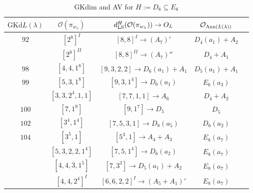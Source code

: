 \documentclass[reqno,12pt]{amsart}
\numberwithin{equation}{section}
\theoremstyle{plain}
\theoremstyle{definition}
\newcommand{\lam}{\lambda}
\renewcommand{\subset}{\subseteq}
\begin{document}
\begin{table}[htbp]\caption{ GKdim and AV for $H:=D_8\subset E_8$}
	\label{tabd8-1}
	\centering
	\renewcommand{\arraystretch}{1.5}
	\setlength\tabcolsep{5pt}
	
{	\begin{tabular}{|c|c|c|c|c|}
		\hline $\mathrm{GKd} L(\lambda)$ & $\mathcal{O}(\pi_{w_{\lam}})$& $d_{\rm LS}^{H}(\mathcal{O}(\pi_{w_\lambda}))\rightarrow    O_{L}$& $\mathcal{O}_{{\rm Ann}(L(\lambda))}$ \\ \hline
		 $ 92 $    &   $[2^8]^I$ & $[8,8]^I\rightarrow    (A_7)' $     &   $ D_4(a_1)+A_2$      \\ 
		   &   $[2^8]^{II}$ &    $[8,8]^{II}\rightarrow     (A_7)'' $   &   $D_4+A_1 $        \\ \hline
     $ 98 $    &  $ [4,4,1^8] $  & $[9,3,2,2]\rightarrow     D_6(a_1)+A_1 $     &   $ D_5(a_1)+A_1$      \\
     \hline
      $ 99 $    &  $ [5, 3, 1^8] $  & $[9,3,1^4]\rightarrow     D_6(a_1) $     &   $ E_6(a_3)$      \\ 
          &  $ [3, 3, 2^4, 1, 1] $  & $[7,7,1,1]\rightarrow     A_6$     &   $ D_4+A_2$      \\ \hline
       $ 100 $    &  $ [7,1^9] $  & $[9,1^7]\rightarrow     D_5 $     &   $ D_5$      \\ \hline
        $ 102 $    &  $ [3^4,1^4] $  & $[7,5,3,1]\rightarrow    D_8(a_5)$     &   $ D_6(a_2)$     
        \\\hline
         $ 104 $    &  $ [3^5,1] $  & $[5^3,1]\rightarrow     A_4+A_3$     &   $ E_8(a_7)$      \\ 
         &  $ [5,3,2,2,1^4] $  & $[7,5,1^4]\rightarrow    D_6(a_2)  $     &   $ E_8(a_7)$      \\
         &  $ [4,4,3,1^5] $  & $[7,3^3]\rightarrow     D_5(a_1)+A_2 $     &   $ E_8(a_7)$      \\
         &     $ [4,4,2^4]^I $ & $[6,6,2,2]^I\rightarrow    (A_5+A_1)' $     &   $ E_8(a_7)$      \\

\end{tabular}}
\end{table}
\end{document}
